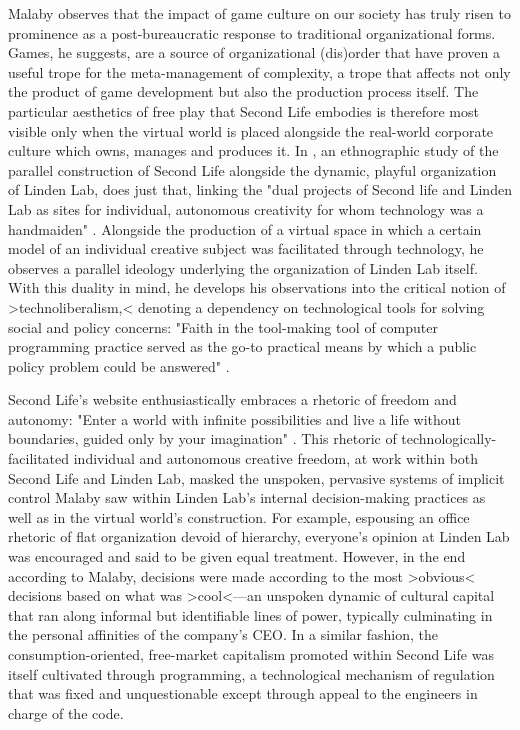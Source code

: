 Malaby observes that the impact of game culture on our society has truly risen to prominence as a post-bureaucratic response to traditional organizational forms. Games, he suggests, are a source of organizational (dis)order that have proven a useful trope for the meta-management of complexity, a trope that affects not only the product of game development but also the production process itself. The particular aesthetics of free play that Second Life embodies is therefore most visible only when the virtual world is placed alongside the real-world corporate culture which owns, manages and produces it. In , an ethnographic study of the parallel construction of Second Life alongside the dynamic, playful organization of Linden Lab, \citeauthor{Malaby2011-my} does just that, linking the "dual projects of Second life and Linden Lab as sites for individual, autonomous creativity for whom technology was a handmaiden" \autocite[78]{Malaby2011-my}. Alongside the production of a virtual space in which a certain model of an individual creative subject was facilitated through technology, he observes a parallel ideology underlying the organization of Linden Lab itself. With this duality in mind, he develops his observations into the critical notion of >technoliberalism,< denoting a dependency on technological tools for solving social and policy concerns: "Faith in the tool-making tool of computer programming practice served as the go-to practical means by which a public policy problem could be answered" \autocite[78]{Malaby2011-my}.

Second Life's website enthusiastically embraces a rhetoric of freedom and autonomy: "Enter a world with infinite possibilities and live a life without boundaries, guided only by your imagination" \autocite{SecondLife}. This rhetoric of technologically-facilitated individual and autonomous creative freedom, at work within both Second Life and Linden Lab, masked the unspoken, pervasive systems of implicit control Malaby saw within Linden Lab's internal decision-making practices as well as in the virtual world's construction. For example, espousing an office rhetoric of flat organization devoid of hierarchy, everyone's opinion at Linden Lab was encouraged and said to be given equal treatment. However, in the end according to Malaby, decisions were made according to the most >obvious< decisions based on what was >cool<---an unspoken dynamic of cultural capital that ran along informal but identifiable lines of power, typically culminating in the personal affinities of the company's CEO. In a similar fashion, the consumption-oriented, free-market capitalism promoted within Second Life was itself cultivated through programming, a technological mechanism of regulation that was fixed and unquestionable except through appeal to the engineers in charge of the code.


